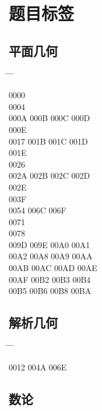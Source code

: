 \documentclass[twoside, twocolumn]{ctexart}
\newenvironment{problist}{
  \begin{center} \ttfamily \begin{tabbing}
      \hspace{50pt} \= \hspace{50pt} \= \hspace{50pt} \= \kill
  }{ \end{tabbing} \end{center} }
\begin{document}
  \balance

  \section*{题目标签}

  \subsection*{平面几何}

  \begin{problist}
    0000    \\ 0004    \\
    000A \> 000B \> 000C \> 000D \\ 000E    \\
    0017 \> 001B \> 001C \> 001D \\ 001E    \\
    0026    \\ 002A \> 002B \> 002C \> 002D \\
    002E    \\ 003F    \\
    0054  \> 006C \> 006F \\ 0071    \\
    0078    \\ 009D \> 009E \> 00A0 \> 00A1 \\
    00A2 \> 00A8 \> 00A9 \> 00AA \\ 00AB \> 00AC \> 00AD \> 00AE \\
    00AF \> 00B2 \> 00B3 \> 00B4 \\ 00B5 \> 00B6 \> 00B8 \> 00BA \\
  \end{problist}

  \subsection*{解析几何}

  \begin{problist}
    0012  \> 004A \> 006E \\
  \end{problist}

  \subsection*{数论}
\end{document}
